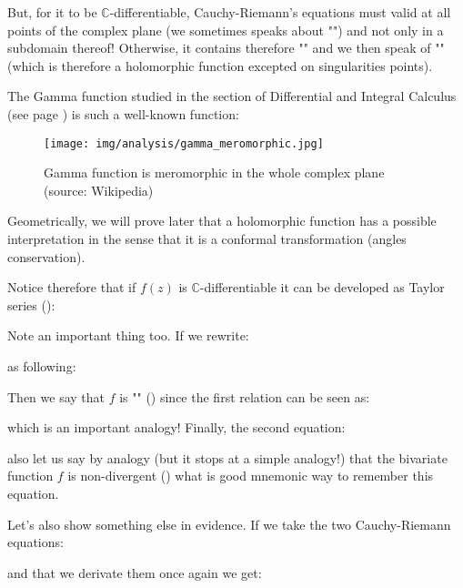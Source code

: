 	But, for it to be $\mathbb{C}$-differentiable, Cauchy-Riemann's equations must valid at all points of the complex plane (we sometimes speaks about "") and not only in a subdomain thereof! Otherwise, it contains therefore "" and we then speak of "\label{meromorphic function}" (which is therefore a holomorphic function excepted on singularities points).
	
	The Gamma function studied in the section of Differential and Integral Calculus (see page \pageref{gamma euler function}) is such a well-known function:
	
	\begin{figure}[H]
		\centering
		\texttt{[image: img/analysis/gamma\_meromorphic.jpg]}
		\caption[Gamma function is meromorphic in the whole complex plane]{Gamma function is meromorphic in the whole complex plane (source: Wikipedia)}
	\end{figure}
	\begin{tcolorbox}[title=Remark,colframe=black,arc=10pt]
	Geometrically, we will prove later that a holomorphic function has a possible interpretation in the sense that it is a conformal transformation (angles conservation).
	\end{tcolorbox}
	
	Notice therefore that if $f (z)$ is $\mathbb{C}$-differentiable it can be developed as Taylor series ():
	
	Note an important thing too. If we rewrite:
	
	as following:
	
	Then we say that $f$ is "" () since the first relation can be seen as:
	
	which is an important analogy! Finally, the second equation:
	
	also let us say by analogy (but it stops at a simple analogy!) that the bivariate function $f$ is non-divergent () what is good mnemonic way to remember this equation.
	
	Let's also show something else in evidence. If we take the two Cauchy-Riemann equations:
	
	and that we derivate them once again we get:
	
